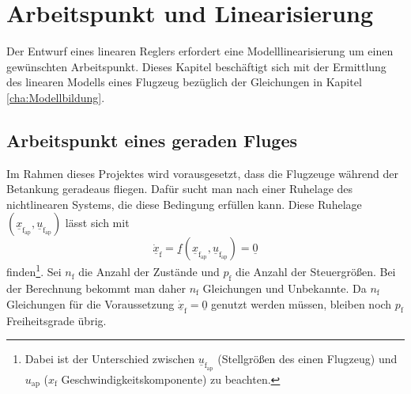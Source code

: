 \chapter{Arbeitspunkt und Linearisierung}\label{cha:Linearisierung}
Der Entwurf eines linearen Reglers erfordert eine Modelllinearisierung um einen gewünschten Arbeitspunkt. Dieses Kapitel beschäftigt sich mit der Ermittlung des linearen Modells eines Flugzeug bezüglich der Gleichungen in Kapitel \ref{cha:Modellbildung}.
\section{Arbeitspunkt eines geraden Fluges}
Im Rahmen dieses Projektes wird vorausgesetzt, dass die Flugzeuge während der Betankung geradeaus fliegen. Dafür sucht man nach einer Ruhelage des nichtlinearen Systems, die diese Bedingung erfüllen kann. Diese Ruhelage $(\underline{x}_\mathrm{f_{ap}},\underline{u}_\mathrm{f_{ap}})$ lässt sich mit
\begin{equation}
\underline{\dot{x}}_\mathrm{f} = \underline{f}(\underline{x}_\mathrm{f_{ap}},\underline{u}_\mathrm{f_{ap}}) = \underline{0}
\end{equation}
finden\footnote{Dabei ist der Unterschied zwischen $\underline{u}_\mathrm{f_{ap}}$ (Stellgrö{\ss}en des einen Flugzeug) und $u_\mathrm{ap}$ ($x_\mathrm{f}$ Geschwindigkeitskomponente) zu beachten.}. Sei $n_\mathrm{f}$ die Anzahl der Zustände und $p_\mathrm{f}$ die Anzahl der Steuergrö{\ss}en. Bei der Berechnung bekommt man daher $n_\mathrm{f}$ Gleichungen und Unbekannte. Da $n_\mathrm{f}$ Gleichungen für die Voraussetzung $\underline{\dot{x}}_\mathrm{f} = \underline{0}$ genutzt werden müssen, bleiben noch $p_\mathrm{f}$ Freiheitsgrade übrig.\\

